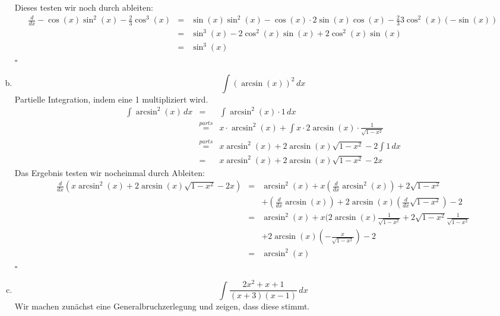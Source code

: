 \documentclass[11pt,a4paper,ngerman]{article}
\begin{document}
\begin{enumerate}[a.]
        Dieses testen wir noch durch ableiten:
        $$\begin{array}{rcl}
               \frac{d}{dx} -\cos(x)\sin^2(x) - \frac{2}{3}\cos^3(x)
                    &=& \sin(x)\sin^2(x) - \cos(x)\cdot 2\sin(x)\cos(x) - \frac{2}{3} 3 \cos^2(x) (-\sin(x))\\
                    &=& \sin^3(x) - 2\cos^2(x)\sin(x) + 2 \cos^2(x)\sin(x)\\    
                    &=& \sin^3(x) 
        \end{array}$$
        \mbox{}\hfill $\square$
    \item
        $$
           \int \left( \arcsin (x) \right)^2 \, dx
        $$
        Partielle Integration, indem eine 1 multipliziert wird.
        $$\begin{array}{rcl}
            \int \arcsin^2 (x) \, dx &=& \int \arcsin^2(x) \cdot 1 \, dx\\
                &\stackrel{parts}{=}& 
                    x \cdot \arcsin^2(x) + \int x \cdot 2\arcsin(x)\cdot \frac{1}{\sqrt{1-x^2}}\\
                &\stackrel{parts}{=}&
                    x\arcsin^2(x) + 2 \arcsin(x)\sqrt{1-x^2} - 2 \int 1 \, dx\\
                &=& x\arcsin^2(x) + 2\arcsin(x)\sqrt{1-x^2} - 2x 
        \end{array}$$
        Das Ergebnis testen wir nocheinmal durch Ableiten:
        $$\begin{array}{rcl}
            \frac{d}{dx} \left( x\arcsin^2(x) + 2\arcsin(x)\sqrt{1-x^2} - 2x\right)
                &=& \arcsin^2(x) + x(\frac{d}{dx} \arcsin^2(x)) + 2\sqrt{1-x^2}\\
                &&    +(\frac{d}{dx} \arcsin(x)) + 2\arcsin(x) (\frac{d}{dx} \sqrt{1-x^2}) - 2\\
                &=& \arcsin^2(x) + x(2\arcsin(x)\frac{1}{\sqrt{1-x^2}} + 2\sqrt{1-x^2}\frac{1}{\sqrt{1-x^2}}\\
                &&    + 2 \arcsin(x) (-\frac{x}{\sqrt{1-x^2}}) - 2\\
                &=& \arcsin^2(x)
        \end{array}$$
        \mbox{} \hfill $\square$
    \item
        $$
            \int \frac{2x^2 + x + 1}{(x+3)(x-1)} \, dx
        $$
        Wir machen zunächst eine Generalbruchzerlegung und zeigen, dass diese stimmt.
\end{enumerate}
\end{document}
